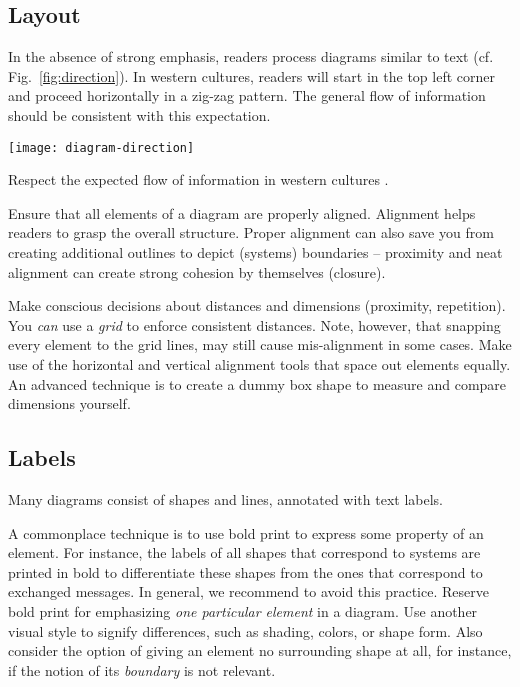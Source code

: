\subsection{Layout}

In the absence of strong emphasis, readers process diagrams similar to text (cf. Fig.~\ref{fig:direction}). In western cultures, readers will start in the top left corner and proceed horizontally in a zig-zag pattern. The general flow of information should be consistent with this expectation.

\begin{marginfigure}
\centering
\texttt{[image: diagram-direction]}
\caption{\label{fig:direction} Respect the expected flow of information in western cultures \cite{Carter12}.}%
\end{marginfigure}


Ensure that all elements of a diagram are properly aligned. Alignment helps readers to grasp the overall structure. Proper alignment can also save you from creating additional outlines to depict (systems) boundaries – proximity and neat alignment can create strong cohesion by themselves (closure).

Make conscious decisions about distances and dimensions (proximity, repetition). You \emph{can} use a \emph{grid} to enforce consistent distances. Note, however, that snapping every element to the grid lines, may still cause mis-alignment in some cases. Make use of the horizontal and vertical alignment tools that space out elements equally. An advanced technique is to create a dummy box shape to measure and compare dimensions yourself.

\subsection{Labels}

Many diagrams consist of shapes and lines, annotated with text labels.

A commonplace technique is to use bold print to express some property of an element. For instance, the labels of all shapes that correspond to systems are printed in bold to differentiate these shapes from the ones that correspond to exchanged  messages. In general, we recommend to avoid this practice. Reserve bold print for emphasizing \emph{one particular element} in a diagram. Use another visual style to signify differences, such as shading, colors, or shape form. Also consider the option of giving an element no surrounding shape at all, for instance, if the notion of its \emph{boundary} is not relevant.

